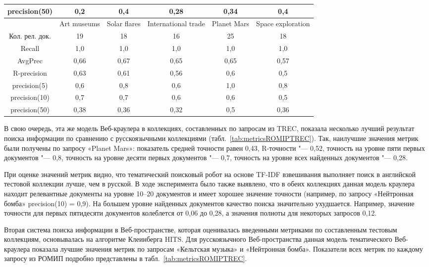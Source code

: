 \begin{table}[ht]
\begin{adjustbox}{width=0.9\textwidth}
\begin{tabular}{ c  c  c  c  c  c }
			precision(50) & 0,2 & 0,4 & 0,28 & 0,34 & 0,4  \\
			\hline
			& Art museums & Solar flares & International trade &  Planet Mars &  Space exploration \\
			\hline
			Кол. рел. док. & 19 & 18 & 16 & 25 & 18  \\
			Recall & 1,0 & 1,0 & 1,0 & 1,0 & 1,0 \\
			AvgPrec & 0,66 & 0,67 & 0,65 & 0,65 & 0,57  \\
			R-precision & 0,63 & 0,61 & 0,56 & 0,6 & 0,5  \\
			precision(5) & 0,6 & 0,8 & 0,6 & 1,0 & 0,8  \\
			precision(10) & 0,7 & 0,7 & 0,6 & 0,6 & 0,5  \\
			precision(50) & 0,38 & 0,36 & 0,32 & 0,5 & 0,36  \\
			\bottomrule
		\end{tabular}%
	\end{adjustbox}
\end{table}

В свою очередь, эта же модель Веб-краулера в коллекциях, составленных по запросам из TREC, показала несколько лучший результат поиска информации по сравнению с русскоязычными коллекциями (табл.~\cref{tab:metricsROMIPTREC}). Так, наилучшие значения метрик были получены по запросу «Planet Mars»: показатель средней точности равен 0,43, R-точности "--- 0,52, точность на уровне пяти первых документов "--- 0,8, точность на уровне десяти первых документов "--- 0,7, точность на уровне всех найденных документов "--- 0,28.

При оценке значений метрик видно, что тематический поисковый робот на основе TF-IDF взвешивания выполняет поиск в английской тестовой коллекции лучше, чем в русской. В ходе эксперимента было также выявлено, что в обеих коллекциях данная модель краулера находит релевантные документы на уровне 10–20 документов и имеет хорошее значение точности (например, по запросу «Нейтронная бомба» precision(10) = 0,9). На большем уровне найденных документов качество поиска значительно ухудшается. Например, значение точности для первых пятидесяти документов колеблется от 0,06 до 0,28, а значения полноты для некоторых запросов 0,12.

Вторая система поиска информации в Веб-пространстве, которая оценивалась введенными метриками по составленным тестовым коллекциям, основывалась на алгоритме Клеинберга HITS. Для русскоязычного Веб-пространства данная модель тематического Веб-краулера показала лучшие значения метрик по запросам «Кельтская музыка» и «Нейтронная бомба». Показатели всех метрик по каждому запросу из РОМИП подробно представлены в табл.~\cref{tab:metricsROMIPTREC}.

